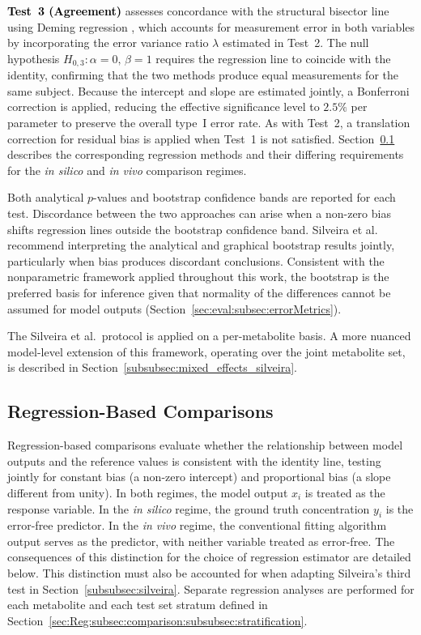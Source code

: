 \textcolor{black}{\textbf{Test~3 (Agreement)}} assesses concordance with the structural bisector line using Deming regression \cite{Linnet1998}, which accounts for measurement error in both variables by incorporating the error variance ratio $\lambda$ estimated in Test~2. The null hypothesis $H_{0,3}: \alpha = 0,\, \beta = 1$ requires the regression line to coincide with the identity, confirming that the two methods produce equal measurements for the same subject. Because the intercept and slope are estimated jointly, a Bonferroni correction is applied, reducing the effective significance level to $2.5\%$ per parameter to preserve the overall type~I error rate. As with Test~2, a translation correction for residual bias is applied when Test~1 is not satisfied. Section~\ref{sec:Reg:subsec:comparison:subsubsec:regression} describes the corresponding regression methods and their differing requirements for the \textit{in silico} and \textit{in vivo} comparison regimes.

Both analytical $p$-values and bootstrap confidence bands are reported for each test. Discordance between the two approaches can arise when a non-zero bias shifts regression lines outside the bootstrap confidence band. Silveira et al.~\cite{Silveira2024} recommend interpreting the analytical and graphical bootstrap results jointly, particularly when bias produces discordant conclusions. Consistent with the nonparametric framework applied throughout this work, the bootstrap is the preferred basis for inference given that normality of the differences cannot be assumed for \DL model outputs (Section~\ref{sec:eval:subsec:errorMetrics}).

The Silveira et al.\ protocol is applied on a per-metabolite basis. A more nuanced model-level extension of this framework, operating over the joint metabolite set, is described in Section~\ref{subsubsec:mixed_effects_silveira}.

\subsection{Regression-Based Comparisons}
\label{sec:Reg:subsec:comparison:subsubsec:regression}
Regression-based comparisons evaluate whether the relationship between \DL model outputs and the reference values is consistent with the identity line, testing jointly for constant bias (a non-zero intercept) and proportional bias (a slope different from unity). In both regimes, the \DL model output $x_i$ is treated as the response variable. In the \textit{in silico} regime, the ground truth concentration $y_i$ is the error-free predictor. In the \textit{in vivo} regime, the conventional fitting algorithm output serves as the predictor, with neither variable treated as error-free. The consequences of this distinction for the choice of regression estimator are detailed below. This distinction must also be accounted for when adapting Silveira's third test in Section~\ref{subsubsec:silveira}. 
Separate regression analyses are performed for each metabolite and each test set stratum defined in Section~\ref{sec:Reg:subsec:comparison:subsubsec:stratification}. 


